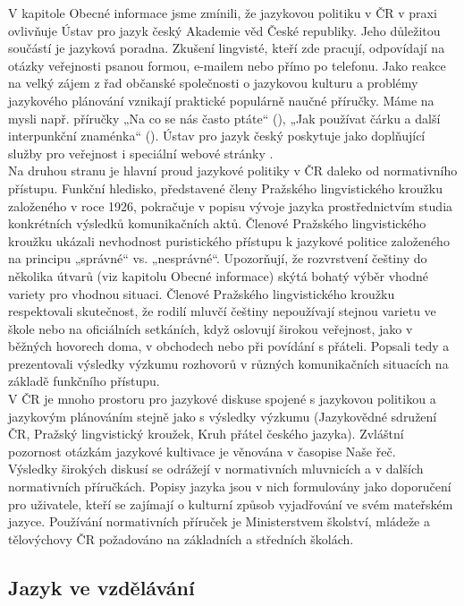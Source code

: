 \begin{multicols}{2}
V kapitole Obecné informace jsme zmínili, že jazykovou politiku v ČR v praxi ovlivňuje Ústav pro jazyk český Akademie věd České republiky. Jeho důležitou součástí je jazyková poradna. Zkušení lingvisté, kteří zde pracují, odpovídají na otázky veřejnosti psanou formou, e-mailem nebo přímo po telefonu. Jako reakce na velký zájem z řad občanské společnosti o jazykovou kulturu a problémy jazykového plánování vznikají praktické populárně naučné příručky. Máme na mysli např. příručky „Na co se nás často ptáte“ (\cite{Cerna}), „Jak používat čárku a další interpunkční znaménka“ (\cite{Janovec}). Ústav pro jazyk český poskytuje jako doplňující služby pro veřejnost i speciální webové stránky \cite{Note6}.\\
Na druhou stranu je hlavní proud jazykové politiky v ČR daleko od normativního přístupu. Funkční hledisko, představené členy Pražského lingvistického kroužku založeného v roce 1926, pokračuje v popisu vývoje jazyka prostřednictvím studia konkrétních výsledků komunikačních aktů. Členové Pražského lingvistického kroužku ukázali nevhodnost puristického přístupu k jazykové politice založeného na principu „správné“ vs. „nesprávné“. Upozorňují, že rozvrstvení češtiny do několika útvarů (viz kapitolu Obecné informace) skýtá bohatý výběr vhodné variety pro vhodnou situaci. Členové Pražského lingvistického kroužku respektovali skutečnost, že rodilí mluvčí češtiny nepoužívají stejnou varietu ve škole nebo na oficiálních setkáních, když oslovují širokou veřejnost, jako v běžných hovorech doma, v obchodech nebo při povídání s přáteli. Popsali tedy a prezentovali výsledky výzkumu rozhovorů v různých komunikačních situacích na základě funkčního přístupu.\\
V ČR je mnoho prostoru pro jazykové diskuse spojené s jazykovou politikou a jazykovým plánováním stejně jako s výsledky výzkumu (Jazykovědné sdružení ČR, Pražský lingvistický kroužek, Kruh přátel českého jazyka). Zvláštní pozornost otázkám jazykové kultivace je věnována v časopise Naše řeč.\\
Výsledky širokých diskusí se odrážejí v normativních mluvnicích a v dalších normativních příručkách. Popisy jazyka jsou v nich formulovány jako doporučení pro uživatele, kteří se zajímají o kulturní způsob vyjadřování ve svém mateřském jazyce. Používání normativních příruček je Ministerstvem školství, mládeže a tělovýchovy ČR požadováno na základních a středních školách.
  
\subsection{Jazyk ve vzdělávání}


\end{multicols}
